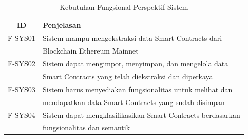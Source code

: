 \begin{table}[ht]
	\caption{Kebutuhan Fungsional Perspektif Sistem}
	\vspace{0.25cm}
	\begin{center}
		\begin{tabular}{|c|l|}
			\hline
			\textbf{ID} & \textbf{Penjelasan}                                         \\ \hline
			F-SYS01     & Sistem mampu mengekstraksi data Smart Contracts dari        \\ & Blockchain Ethereum Mainnet \\ \hline
			F-SYS02     & Sistem dapat mengimpor, menyimpan, dan mengelola data       \\ & Smart Contracts yang telah diekstraksi dan diperkaya  \\ \hline
			F-SYS03     & Sistem harus menyediakan fungsionalitas untuk melihat dan   \\ & mendapatkan data Smart Contracts yang sudah disimpan  \\ \hline
			F-SYS04     & Sistem dapat mengklasifikasikan Smart Contracts berdasarkan \\ & fungsionalitas dan semantik \\ \hline
		\end{tabular}
	\end{center}
\end{table}



